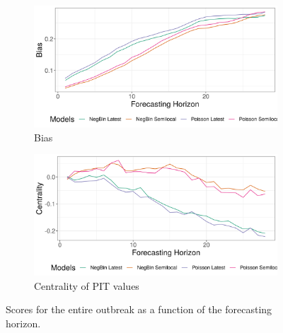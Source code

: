 \begin{figure}[H]
\begin{subfigure}{0.5\textwidth}
  \centering
  \includegraphics[width=\linewidth]{../output/Vuhovi_bias.png}  
  \caption{Bias}
  \label{fig:sub-third}
\end{subfigure}
\begin{subfigure}{0.5\textwidth}
  \centering
  \includegraphics[width=\linewidth]{../output/Vuhovi_centrality.png}  
  \caption{Centrality of PIT values}
  \label{fig:nat_scores_4}
\end{subfigure}
  \caption{Scores for the entire outbreak as a function of the forecasting horizon.}

  \label{fig:nat_scores}
\end{figure}
